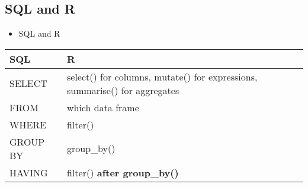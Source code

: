 \documentclass[
]{book}
\providecommand{\tightlist}{%
  \setlength{\itemsep}{0pt}\setlength{\parskip}{0pt}}
\begin{document}
\hypertarget{sql-and-r}{%
\subsection{SQL and R}\label{sql-and-r}}

\begin{itemize}
\tightlist
\item
  SQL and R
\end{itemize}

\begin{longtable}[]{@{}ll@{}}
\toprule
\begin{minipage}[b]{0.14\columnwidth}\raggedright
SQL\strut
\end{minipage} & \begin{minipage}[b]{0.80\columnwidth}\raggedright
R\strut
\end{minipage}\tabularnewline
\midrule
\endhead
\begin{minipage}[t]{0.14\columnwidth}\raggedright
SELECT\strut
\end{minipage} & \begin{minipage}[t]{0.80\columnwidth}\raggedright
select() for columns, mutate() for expressions, summarise() for aggregates\strut
\end{minipage}\tabularnewline
\begin{minipage}[t]{0.14\columnwidth}\raggedright
FROM\strut
\end{minipage} & \begin{minipage}[t]{0.80\columnwidth}\raggedright
which data frame\strut
\end{minipage}\tabularnewline
\begin{minipage}[t]{0.14\columnwidth}\raggedright
WHERE\strut
\end{minipage} & \begin{minipage}[t]{0.80\columnwidth}\raggedright
filter()\strut
\end{minipage}\tabularnewline
\begin{minipage}[t]{0.14\columnwidth}\raggedright
GROUP BY\strut
\end{minipage} & \begin{minipage}[t]{0.80\columnwidth}\raggedright
group\_by()\strut
\end{minipage}\tabularnewline
\begin{minipage}[t]{0.14\columnwidth}\raggedright
HAVING\strut
\end{minipage} & \begin{minipage}[t]{0.80\columnwidth}\raggedright
filter() \textbf{after group\_by()}\strut

\end{minipage}
\end{longtable}
\end{document}
